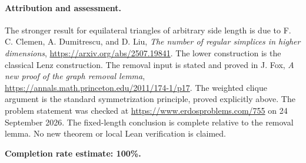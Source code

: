 \paragraph{Attribution and assessment.}
The stronger result for equilateral triangles of arbitrary side length is due to F. C. Clemen, A. Dumitrescu, and D. Liu, \emph{The number of regular simplices in higher dimensions}, \url{https://arxiv.org/abs/2507.19841}. The lower construction is the classical Lenz construction. The removal input is stated and proved in J. Fox, \emph{A new proof of the graph removal lemma}, \url{https://annals.math.princeton.edu/2011/174-1/p17}. The weighted clique argument is the standard symmetrization principle, proved explicitly above. The problem statement was checked at \url{https://www.erdosproblems.com/755} on 24 September 2026. The fixed-length conclusion is complete relative to the removal lemma. No new theorem or local Lean verification is claimed.

\textbf{Completion rate estimate: 100\%.}
